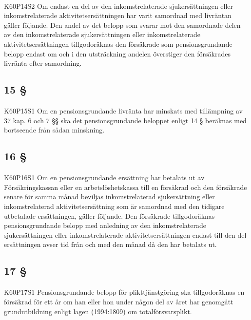 \documentclass[a4paper,notitlepage,openany,10pt]{book}
\begin{document}
\paragraph*{}
{\tiny K60P14S2}
Om endast en del av den inkomstrelaterade sjukersättningen eller inkomstrelaterade aktivitetsersättningen har varit samordnad med livräntan gäller följande. Den andel av det belopp som svarar mot den samordnade delen av den inkomstrelaterade sjukersättningen eller inkomstrelaterade aktivitetsersättningen tillgodoräknas den försäkrade som pensionsgrundande belopp endast om och i den utsträckning andelen överstiger den försäkrades livränta efter samordning.
\subsection*{15 §}
\paragraph*{}
{\tiny K60P15S1}
Om en pensionsgrundande livränta har minskats med tillämpning av 37 kap. 6 och 7 §§ ska det pensionsgrundande beloppet enligt 14 § beräknas med bortseende från sådan minskning.
\subsection*{16 §}
\paragraph*{}
{\tiny K60P16S1}
Om en pensionsgrundande ersättning har betalats ut av Försäkringskassan eller en arbetslöshetskassa till en försäkrad och den försäkrade senare för samma månad beviljas inkomstrelaterad sjukersättning eller inkomstrelaterad aktivitetsersättning som är samordnad med den tidigare utbetalade ersättningen, gäller följande. Den försäkrade tillgodoräknas pensionsgrundande belopp med anledning av den inkomstrelaterade sjukersättningen eller inkomstrelaterade aktivitetsersättningen endast till den del ersättningen avser tid från och med den månad då den har betalats ut.
\subsection*{17 §}
\paragraph*{}
{\tiny K60P17S1}
Pensionsgrundande belopp för plikttjänstgöring ska tillgodoräknas en försäkrad för ett år om han eller hon under någon del av året har genomgått grundutbildning enligt lagen (1994:1809) om totalförsvarsplikt.
\end{document}
